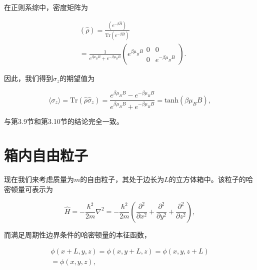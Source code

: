 在正则系综中，密度矩阵为

\begin{equation}\tag{5.3.3}\label{eq:5.3.3}
\begin{array}{rl} & { ( \hat { \rho } ) = \frac { \left( e ^{- \beta \hat { H} } \right) } { \mathrm { T r } \left( e ^{- \beta \hat { H} } \right) } } \\& { = \frac { 1 } { e ^{\beta \mu _ { B} B } + e ^{- \beta \mu _ { B} B } } \left( e ^{\beta \mu _ { B} B } \begin{array}{cc} { { 0 } } & { { 0 } } \\{ { 0 } } & { { e ^{- \beta \mu _ { B} B } } } \end{array} \right) . } \end{array}
\end{equation}

因此，我们得到\(\sigma_{z}\)的期望值为

\begin{equation}\tag{5.3.4}\label{eq:5.3.4}
\langle \sigma _ { z } \rangle = \mathrm { T r } ( \hat { \rho } \hat { \sigma } _ { z } ) = \frac { e ^{\beta \mu _ { B} B } - e ^{- \beta \mu _ { B} B } } { e ^{\beta \mu _ { B} B } + e ^{- \beta \mu _ { B} B } } = \mathrm { t a n h } ( \beta \mu _ { B } B ) ,
\end{equation}

与第3.9节和第3.10节的结论完全一致。

\section{箱内自由粒子}\label{b-ux7bb1ux5185ux81eaux7531ux7c92ux5b50}

现在我们来考虑质量为\(m\)的自由粒子，其处于边长为\(L\)的立方体箱中。该粒子的哈密顿量可表示为

\begin{equation}\tag{5.3.5}\label{eq:5.3.5}
\hat { H } = - \frac { \hbar ^{2} } { 2 m } \nabla ^{2} = - \frac { \hbar ^{2} } { 2 m } \left( \frac { \partial ^{2} } { \partial x ^{2} } + \frac { \partial ^{2} } { \partial y ^{2} } + \frac { \partial ^{2} } { \partial z ^{2} } \right) ,
\end{equation}

而满足周期性边界条件的哈密顿量的本征函数，

\begin{equation}\tag{5.3.6}\label{eq:5.3.6}
\begin{array}{r} { \phi ( x + L , y , z ) = \phi ( x , y + L , z ) = \phi ( x , y , z + L ) } \\{ = \phi ( x , y , z ) , } \end{array}
\end{equation}

